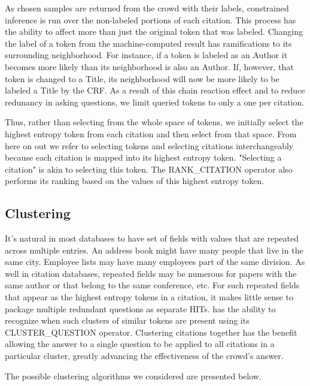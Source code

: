 
As chosen samples are returned from the crowd with their labels, constrained inference is run over the non-labeled portions of each citation.  This process has the ability to affect more than just the original token that was labeled.  Changing the label of a token from the machine-computed result has ramifications to its surrounding neighborhood.  For instance, if a token is labeled as an Author it becomes more likely than its neighborhood is also an Author.  If, however, that token is changed to a Title, its neighborhood will now be more likely to be labeled a Title by the CRF.  As a result of this chain reaction effect and to reduce redunancy in asking questions, we limit queried tokens to only a one per citation.

Thus, rather than selecting from the whole space of tokens, we initially select the highest entropy token from each citation and then select from that space.  From here on out we refer to selecting tokens and selecting citations interchangeably because each citation is mapped into its highest entropy token.  "Selecting a citation" is akin to selecting this token.  The RANK\_CITATION operator also performs its ranking based on the values of this highest entropy token.

\subsection{Clustering}

It's natural in most databases to have set of fields with values that are repeated across multiple entries.  An address book might have many people that live in the same city.  Employee lists may have many employees part of the same division.  As well in citation databases, repeated fields may be numerous for papers with the same author or that belong to the same conference, etc.  For such repeated fields that appear as the highest entropy tokens in a citation, it makes little sense to package multiple redundant questions as separate HITs.  \sysName has the ability to recognize when such clusters of similar tokens are present using its CLUSTER\_QUESTION operator.  Clustering citations together has the benefit allowing the answer to a single question to be applied to all citations in a particular cluster, greatly advancing the effectiveness of the crowd's answer.

The possible clustering algorithms we considered are presented below.  

